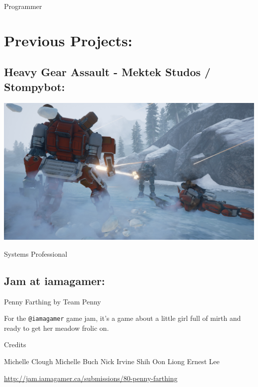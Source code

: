 \documentclass[]{book}
\begin{document}
Programmer

\section{Previous Projects:}\label{previous-projects}

\subsection{Heavy Gear Assault - Mektek Studos /
Stompybot:}\label{heavy-gear-assault---mektek-studos-stompybot}

\includegraphics{Image/HeavyGearAssaultPromoImage.jpg}

Systems Professional

\subsection{Jam at iamagamer:}\label{jam-at-iamagamer}

Penny Farthing by Team Penny

For the \texttt{@iamagamer} game jam, it's a game about a little girl
full of mirth and ready to get her meadow frolic on.

Credits

Michelle Clough Michelle Buch Nick Irvine Shih Oon Liong Ernest Lee

\url{http://jam.iamagamer.ca/submissions/80-penny-farthing}


\end{document}
